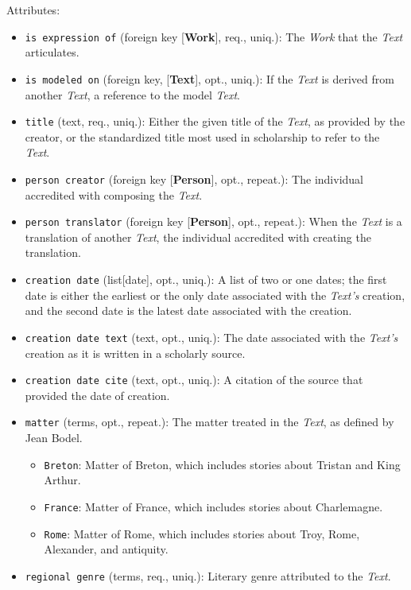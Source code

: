 \vspace{1em}
\noindent Attributes:
\begin{itemize}
    \item \texttt{is expression of} (foreign key [\textbf{Work}], req., uniq.): The \textit{Work} that the \textit{Text} articulates.
    \item \texttt{is modeled on} (foreign key, [\textbf{Text}], opt., uniq.): If the \textit{Text} is derived from another \textit{Text}, a reference to the model \textit{Text}.
    \item \texttt{title} (text, req., uniq.): Either the given title of the \textit{Text}, as provided by the creator, or the standardized title most used in scholarship to refer to the \textit{Text}.
    \item \texttt{person creator} (foreign key [\textbf{Person}], opt., repeat.): The individual accredited with composing the \textit{Text}.
    \item \texttt{person translator} (foreign key [\textbf{Person}], opt., repeat.): When the \textit{Text} is a translation of another \textit{Text}, the individual accredited with creating the translation.
    \item \texttt{creation date} (list[date], opt., uniq.): A list of two or one dates; the first date is either the earliest or the only date associated with the \textit{Text's} creation, and the second date is the latest date associated with the creation.
    \item \texttt{creation date text} (text, opt., uniq.): The date associated with the \textit{Text's} creation as it is written in a scholarly source.
    \item \texttt{creation date cite} (text, opt., uniq.): A citation of the source that provided the date of creation.
    \item \texttt{matter} (terms, opt., repeat.): The matter treated in the \textit{Text}, as defined by Jean Bodel.
    \begin{itemize}
        \item \texttt{Breton}: Matter of Breton, which includes stories about Tristan and King Arthur.
        \item \texttt{France}: Matter of France, which includes stories about Charlemagne.
        \item \texttt{Rome}: Matter of Rome, which includes stories about Troy, Rome, Alexander, and antiquity.
    \end{itemize}
    \item \texttt{regional genre} (terms, req., uniq.): Literary genre attributed to the \textit{Text}.

\end{itemize}
